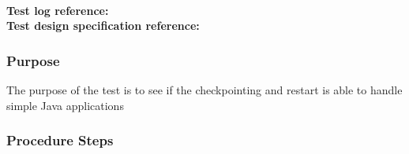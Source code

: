 


\\
\noindent\textbf{Test log reference: } \\%
\noindent\textbf{Test design specification reference: } %




\subsubsection{Purpose}

The purpose of the test is to see if the checkpointing and restart is able to handle simple Java applications

\subsubsection{Procedure Steps}


